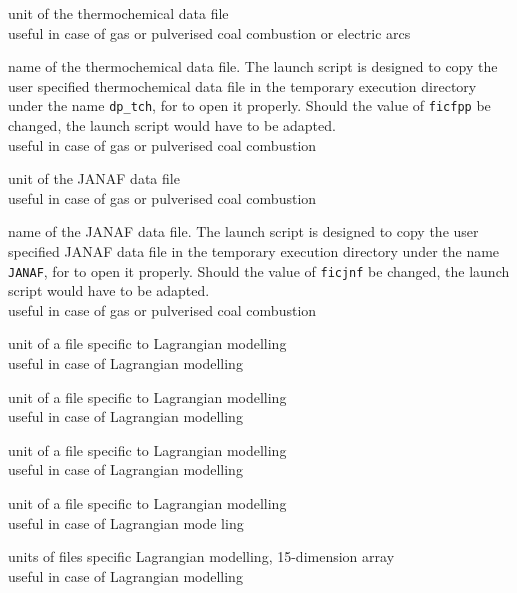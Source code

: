 
{unit of the thermochemical data file\\
useful in case of gas or pulverised coal combustion or electric arcs}

{name of the thermochemical data file. The launch script is designed to copy the
user specified thermochemical data file in the temporary execution directory
under the name \texttt{dp\_tch}, for \CS to open it properly. Should the value
of {\tt ficfpp} be changed, the launch script would have to be adapted.\\
useful in case of gas or pulverised coal combustion}

{unit of the JANAF data file\\
useful in case of gas or pulverised coal combustion}

{name of the JANAF data file. The launch script is designed to copy the
user specified JANAF data file in the temporary execution directory
under the name \texttt{JANAF}, for \CS to open it properly. Should the value
of {\tt ficjnf} be changed, the launch script would have to be adapted.\\
useful in case of gas or pulverised coal combustion}


{unit of a file specific to Lagrangian modelling\\
useful in case of Lagrangian modelling}

{unit of a file specific to Lagrangian modelling\\
useful in case of Lagrangian modelling}

{unit of a file specific to Lagrangian modelling\\
useful in case of Lagrangian modelling}

{unit of a file specific to Lagrangian modelling\\
useful in case of Lagrangian mode ling}

{units of files specific Lagrangian modelling, 15-dimension array\\
useful in case of Lagrangian modelling}


